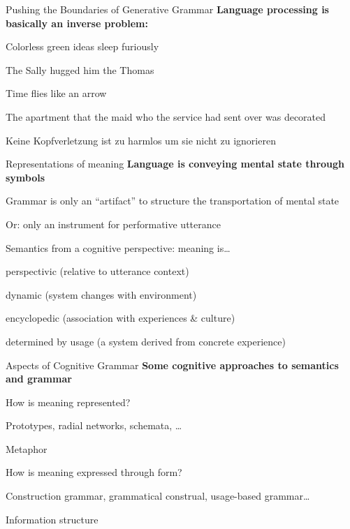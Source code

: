 \documentclass[aspectratio=169,cramped]{beamer}
\let\tempone\itemize
\let\temptwo\enditemize
\renewenvironment{itemize}{\tempone\addtolength{\itemsep}{-0\baselineskip}\addtolength{\parskip}{-0.2\baselineskip}}{\temptwo}
\newcommand{\ex}[1]{{\color{teal} #1}}
\begin{document}
\begin{frame}{Pushing the Boundaries of Generative Grammar}
	\textbf{Language processing is basically an inverse problem:}
  \begin{itemize}
  \item \ex{Colorless green ideas sleep furiously}
  \item \ex{The Sally hugged him the Thomas}
  \item \ex{Time flies like an arrow}
  \item \ex{The apartment that the maid who the service had sent over was decorated}
  \item \ex{Keine Kopfverletzung ist zu harmlos um sie nicht zu ignorieren}
  \end{itemize}
\end{frame}

\begin{frame}{Representations of meaning}
	\textbf{Language is conveying mental state through symbols}
  \begin{itemize}
  \item Grammar is only an ``artifact'' to structure the transportation of mental state
    \begin{itemize}
    \item Or: only an instrument for performative utterance
    \end{itemize}
  \item Semantics from a cognitive perspective: meaning is\ldots
    \begin{itemize}
    \item perspectivic (relative to utterance context)
    \item dynamic (system changes with environment)
    \item encyclopedic (association with experiences \& culture)
    \item determined by usage (a system derived from concrete experience)
    \end{itemize}
  \end{itemize}
\end{frame}

\begin{frame}{Aspects of Cognitive Grammar}
	\textbf{Some cognitive approaches to semantics and grammar}
  \begin{itemize}
    \item How is meaning represented?
      \begin{itemize}
      \item \ex{Prototypes, radial networks, schemata, \ldots}
      \item \ex{Metaphor}
      \end{itemize}
    \item How is meaning expressed through form?
      \begin{itemize}
      \item \ex{Construction grammar, grammatical construal, usage-based grammar\ldots}
      \item \ex{Information structure}
      \end{itemize}
  \end{itemize}
\end{frame}
\end{document}
